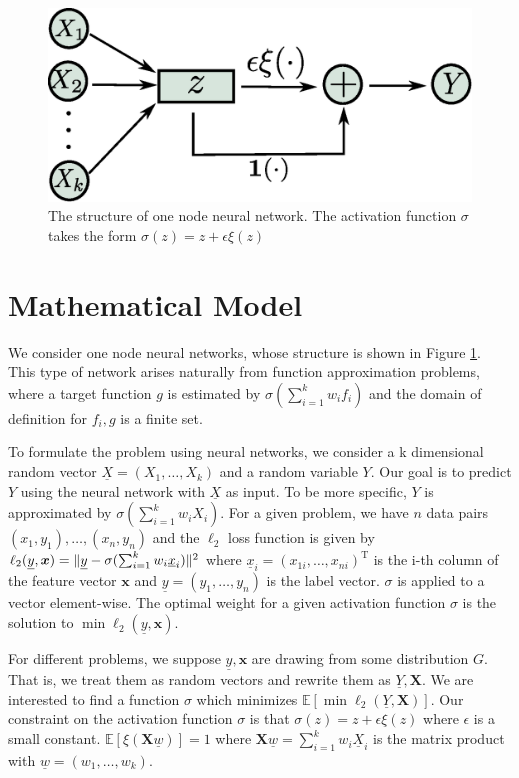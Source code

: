 \documentclass[conference]{IEEEtran}
\DeclarePairedDelimiter\norm{\lVert}{\rVert}
\def\E{\mathbb{E}}
\def\T{\mathrm{T}}
\begin{document}
\begin{figure}\label{fig:ns}
\includegraphics[width=\linewidth]{network_structure.eps}
\caption{The structure of one node neural network. The activation function $\sigma$ takes the form $\sigma(z)=z + \epsilon \xi(z)$}
\end{figure}

\section{Mathematical Model}\label{sec:mm}
We consider one node neural networks, whose structure is shown in Figure \ref{fig:ns}.
This type of network arises naturally from function approximation problems, where a target function $g$
is estimated by $\sigma(\sum_{i=1}^k w_i f_i)$ and the domain of definition for $f_i, g$ is a finite set.

To formulate the problem using neural networks, we consider a k dimensional random vector $\underline{X}=(X_1, \dots, X_k)$ and a random variable $Y$.
Our goal is to predict $Y$ using the neural network with $\underline{X}$ as input.
To be more specific, $Y$ is approximated by $ \sigma(\sum_{i=1}^k w_i X_i)$.
For a given problem, we have $n$ data pairs $(x_1, y_1), \dots, (x_n, y_n)$ and
the $\ell_2$ loss function is given by
$\ell_2(\underline{y}, \bm{x}) = \norm{\underline{y} - \sigma(\sum_{i=1}^k w_i \underline{x}_i)}^2 $
where $\underline{x}_i= (x_{1i}, \dots, x_{ni})^\T$ is the i-th column of the feature vector $\bm{x}$ and
$\underline{y} = (y_1, \dots, y_n)$ is the label vector. $\sigma$ is applied to a vector element-wise.
The optimal weight for a given activation function $\sigma$ is the solution to $\min \ell_2(\underline{y}, \bm{x})$.



For different problems, we suppose $\underline{y}, \bm{x}$ are drawing from some distribution $G$.
That is, we treat them as random vectors and rewrite them as $\underline{Y}, \bm{X}$.
We are interested to find a function $\sigma$ which minimizes
$\E[ \min \ell_2(\underline{Y}, \bm{X})]$.
Our constraint on the activation function $\sigma$ is that
$\sigma(z) = z + \epsilon \xi(z)$ where
$\epsilon$ is a small constant.
$\E[\xi(\bm{X}\underline{w})]=1$ where
$\bm{X}\underline{w} = \sum_{i=1}^k w_i \underline{X}_i$ is the matrix product with  $\underline{w}=(w_1, \dots, w_k)$.
\end{document}

